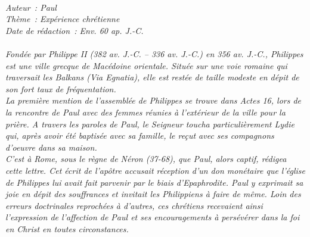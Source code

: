 \BFont
\noindent\hrulefill
{\footnotesize
\textit{
\bigskip
{\centering{}
\\Auteur~: Paul
\\Thème~: Expérience chrétienne
\\Date de rédaction~: Env. 60 ap. J.-C.\\}
}
\textit{
\\Fondée par Philippe II (382 av. J.-C. – 336 av. J.-C.) en 356 av. J.-C., Philippes est une ville grecque de Macédoine orientale. Située sur une voie romaine qui traversait les Balkans (Via Egnatia), elle est restée de taille modeste en dépit de son fort taux de fréquentation.
\\La première mention de l'assemblée de Philippes se trouve dans Actes 16, lors de la rencontre de Paul avec des femmes réunies à l'extérieur de la ville pour la prière. A travers les paroles de Paul, le Seigneur toucha particulièrement Lydie qui, après avoir été baptisée avec sa famille, le reçut avec ses compagnons d'oeuvre dans sa maison.
\\C'est à Rome, sous le règne de Néron (37-68), que Paul, alors captif, rédigea cette lettre. Cet écrit de l'apôtre accusait réception d'un don monétaire que l'église de Philippes lui avait fait parvenir par le biais d'Epaphrodite. Paul y exprimait sa joie en dépit des souffrances et invitait les Philippiens à faire de même. Loin des erreurs doctrinales reprochées à d'autres, ces chrétiens recevaient ainsi l'expression de l'affection de Paul et ses encouragements à persévérer dans la foi en Christ en toutes circonstances.\bigskip
}
}
\par\nobreak\noindent\hrulefill
